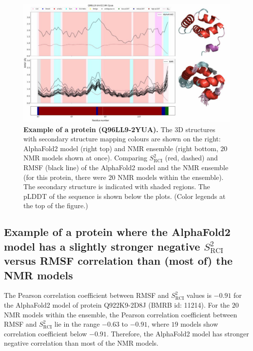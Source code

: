 \begin{figure}[H]
    \centering
    \includegraphics[width=\linewidth]{pLDDT//plddt_figures//supplementary_bhawna/supfig19.pdf}
    \caption{\textbf{Example of a protein (Q96LL9-2YUA).} The 3D structures with secondary structure mapping colours are shown on the right: AlphaFold2 model (right top) and NMR ensemble (right bottom, $20$ NMR models shown at once). Comparing $S_{\text{RCI}}^{2}$ (red, dashed) and RMSF (black line) of the AlphaFold2 model and the NMR ensemble (for this protein, there were $20$ NMR models within the ensemble). The secondary structure is indicated with shaded regions. The pLDDT of the sequence is shown below the plots. (Color legends at the top of the figure.)}
    \label{fig:plddt_sup:sup19}
\end{figure}

\subsection*{Example of a protein where the AlphaFold2 model has a slightly stronger negative $S_{\text{RCI}}^{2}$ versus RMSF correlation than (most of) the NMR models}

The Pearson correlation coefficient between RMSF and $S_{\text{RCI}}^{2}$ values is $-0.91$ for the AlphaFold2 model of protein Q922K9-2D8J (BMRB id: 11214). For the $20$ NMR models within the ensemble, the Pearson correlation coefficient between RMSF and $S_{\text{RCI}}^{2}$ lie in the range $-0.63$ to $-0.91$, where $19$ models show correlation coefficient below $-0.91$. Therefore, the AlphaFold2 model has stronger negative correlation than most of the NMR models.

